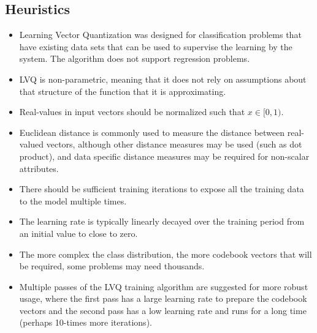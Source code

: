 \subsection{Heuristics}
\begin{itemize}
	\item Learning Vector Quantization was designed for classification problems that have existing data sets that can be used to supervise the learning by the system. The algorithm does not support regression problems.
	\item LVQ is non-parametric, meaning that it does not rely on assumptions about that structure of the function that it is approximating.
	\item Real-values in input vectors should be normalized such that $x \in [0,1)$. 
	\item Euclidean distance is commonly used to measure the distance between real-valued vectors, although other distance measures may be used (such as dot product), and data specific distance measures may be required for non-scalar attributes.
	\item There should be sufficient training iterations to expose all the training data to the model multiple times.
	\item The learning rate is typically linearly decayed over the training period from an initial value to close to zero.
	\item The more complex the class distribution, the more codebook vectors that will be required, some problems may need thousands.
	\item Multiple passes of the LVQ training algorithm are suggested for more robust usage, where the first pass has a large learning rate to prepare the codebook vectors and the second pass has a low learning rate and runs for a long time (perhaps 10-times more iterations).
\end{itemize}

